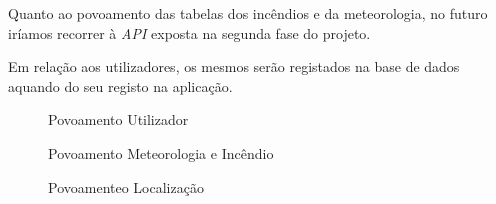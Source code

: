 \documentclass[a4paper,12pt]{scrreprt}
\newcommand{\tab}{
    \hspace{1cm}}
\begin{document}
\tab Quanto ao povoamento das tabelas dos incêndios e da meteorologia, no futuro iríamos recorrer à \textit{API} exposta na segunda fase do projeto.

\tab Em relação aos utilizadores, os mesmos serão registados na base de dados aquando do seu registo na aplicação. 

\begin{figure}[hbt!]
    \centering
    \caption{Povoamento Utilizador}
\end{figure}

\begin{figure}[hbt!]
    \centering
    \caption{Povoamento Meteorologia e Incêndio}
\end{figure}

\begin{figure}[hbt!]
    \centering
    \caption{Povoamenteo Localização}
\end{figure}
\end{document}
